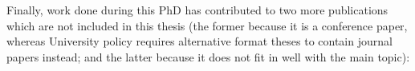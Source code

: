 Finally, work done during this PhD has contributed to two more publications which are not included in this thesis (the former because it is a conference paper, whereas University policy requires alternative format theses to contain journal papers instead; and the latter because it does not fit in well with the main topic):


%
